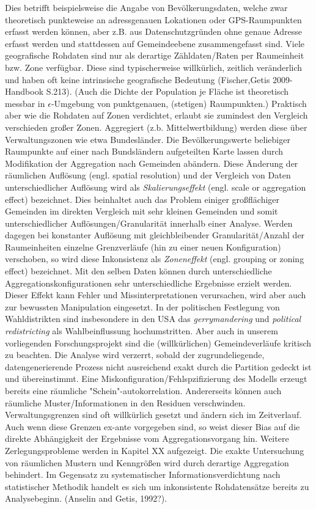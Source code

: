 Dies betrifft beispielsweise die Angabe von Bevölkerungsdaten, welche zwar theoretisch punkteweise an adressgenauen Lokationen oder GPS-Raumpunkten erfasst werden können, 
aber z.B. aus Datenschutzgründen ohne genaue Adresse erfasst werden und stattdessen auf Gemeindeebene zusammengefasst sind. Viele geografische Rohdaten sind nur als derartige 
Zähldaten/Raten per Raumeinheit bzw. Zone verfügbar. Diese sind typischerweise willkürlich, zeitlich veränderlich und haben oft keine intrinsische 
geografische Bedeutung (Fischer,Getis 2009- Handbook S.213).
(Auch die Dichte der Population je Fläche ist theoretisch messbar in $\epsilon$-Umgebung von punktgenauen, (stetigen) Raumpunkten.) 
Praktisch aber wie die Rohdaten auf Zonen verdichtet, erlaubt sie zumindest den Vergleich verschieden großer Zonen.
Aggregiert (z.b. Mittelwertbildung) werden diese über Verwaltungszonen wie etwa Bundesländer.  
Die Bevölkerungswerte beliebiger Raumpunkte auf einer nach Bundsländern aufgeteilten Karte lassen durch Modifikation der Aggregation nach Gemeinden abändern. 
Diese Änderung der räumlichen Auflösung (engl. spatial resolution) und der Vergleich von Daten unterschiedlicher Auflösung wird als \emph{Skalierungseffekt} (engl. scale or aggregation effect) bezeichnet.
Dies beinhaltet auch das Problem einiger großflächiger Gemeinden im direkten Vergleich mit sehr kleinen Gemeinden und somit unterschiedlicher Auflösungen/Granularität innerhalb einer Analyse.
Werden dagegen bei konstanter Auflösung mit gleichbleibender Granularität/Anzahl der Raumeinheiten einzelne Grenzverläufe (hin zu einer neuen Konfiguration) verschoben, 
so wird diese Inkonsistenz als \emph{Zoneneffekt} (engl. grouping or zoning effect) bezeichnet. Mit den selben Daten können durch unterschiedliche Aggregationskonfigurationen 
sehr unterschiedliche Ergebnisse erzielt werden. Dieser Effekt kann Fehler und Missinterpretationen verursachen, wird aber auch zur bewussten Manipulation eingesetzt. 
In der politischen Festlegung von Wahldistrikten sind insbesondere in den USA das \emph{gerrymandering} und \emph{political redistricting} als Wahlbeinflussung hochumstritten.
Aber auch in unserem vorliegenden Forschungsprojekt sind die (willkürlichen) Gemeindeverläufe kritisch zu beachten. Die Analyse wird verzerrt, sobald der zugrundeliegende, datengenerierende
Prozess nicht ausreichend exakt durch die Partition gedeckt ist und übereinstimmt. 
Eine Miskonfiguration/Fehlspzifizierung des Modells erzeugt bereits eine räumliche "Schein"-autokorrelation. Andererseits können auch räumliche Muster/Informationen in den Residuen verschwinden.
Verwaltungsgrenzen sind oft willkürlich gesetzt und ändern sich im Zeitverlauf. 
Auch wenn diese Grenzen ex-ante vorgegeben sind, so weist dieser Bias auf die direkte Abhängigkeit der Ergebnisse vom Aggregationsvorgang hin. 
Weitere Zerlegungsprobleme werden in Kapitel XX aufgezeigt. 
Die exakte Untersuchung von räumlichen Mustern und Kenngrößen wird durch derartige Aggregation behindert. Im Gegensatz zu systematischer Informationsverdichtung nach 
statistischer Methodik handelt es sich um inkonsistente Rohdatensätze bereits zu Analysebeginn. (Anselin and Getis, 1992?). 

